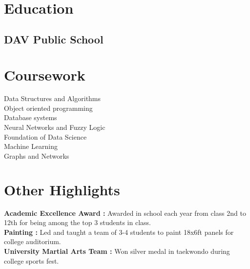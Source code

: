 \documentclass[]{deedy-resume-reversed}
\begin{document}
\begin{minipage}[t]{0.33\textwidth}


\section{Education}

\sectionsep

\subsection{DAV Public School}
\sectionsep



\section{Coursework}
Data Structures and Algorithms\\
Object oriented programming\\
Database systems\\
Neural Networks and Fuzzy Logic\\
Foundation of Data Science\\
Machine Learning\\
Graphs and Networks\\
\sectionsep


\section{Other Highlights}

\textbullet{} \textbf{Academic Excellence Award :} Awarded in school each year from class 2nd to 12th for being among the top 3 students in class.\\
\textbullet{} \textbf{Painting :} Led and taught a team of 3-4 students to paint 18x6ft panels for college auditorium.\\
\textbullet{} \textbf{University Martial Arts Team :} Won silver medal in taekwondo during college sports fest.



\end{minipage}
\end{document}
